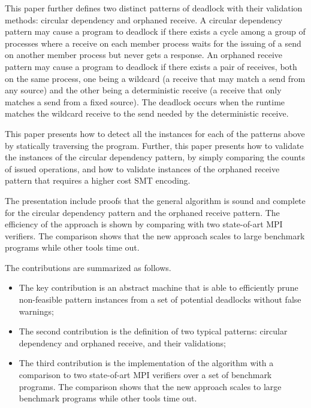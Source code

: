 This paper further defines two distinct patterns of deadlock with their validation methods: circular dependency and orphaned receive. A circular dependency pattern may cause a program to deadlock if there exists a cycle among a group of processes where a receive on each member process waits for the issuing of a send on another member process but never gets a response. An orphaned receive pattern may cause a program to deadlock if there exists a pair of receives, both on the same process, one being a wildcard (a receive that may match a send from any source) and the other being a deterministic receive (a receive that only matches a send from a fixed source). The deadlock occurs when the runtime matches the wildcard receive to the send needed by the deterministic receive. 

This paper presents how to detect all the instances for each of the patterns above by statically traversing the program. Further, this paper presents how to validate the instances of the circular dependency pattern, by simply comparing the counts of issued operations, and how to validate instances of the orphaned receive pattern that requires a higher cost SMT encoding. 

The presentation include proofs that the general algorithm is sound and complete for the circular dependency pattern and the orphaned receive pattern. The efficiency of the approach is shown by comparing with two state-of-art MPI verifiers. The comparison shows that the new approach scales to large benchmark programs while other tools time out.


The contributions are summarized as follows.
\begin{itemize}
\item The key contribution is an abstract machine that is able to efficiently prune non-feasible pattern instances from a set of potential deadlocks without false warnings; 
\item The second contribution is the definition of two typical patterns: circular dependency and orphaned receive, and their validations;
\item The third contribution is the implementation of the algorithm with a comparison to two state-of-art MPI verifiers over a set of benchmark programs. The comparison shows that the new approach scales to large benchmark programs while other tools time out.
\end{itemize}


